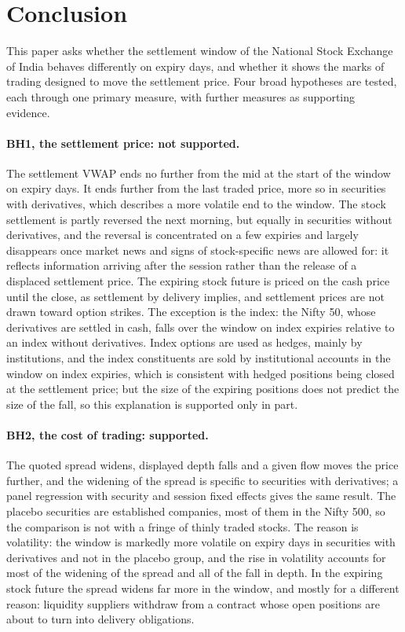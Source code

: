 \section{Conclusion}\label{sec:conclusion}

This paper asks whether the settlement window of the National Stock Exchange of India behaves
differently on expiry days, and whether it shows the marks of trading designed to move the
settlement price. Four broad hypotheses are tested, each through one primary measure, with
further measures as supporting evidence.

\paragraph{BH1, the settlement price: not supported.} The settlement VWAP ends no further from the
mid at the start of the window on expiry days. It ends further from the last traded price, more
so in securities with derivatives, which describes a more volatile end to the window. The stock
settlement is partly reversed the next morning, but equally in securities without derivatives,
and the reversal is concentrated on a few expiries and largely disappears once market news and
signs of stock-specific news are allowed for: it reflects information arriving after the
session rather than the release of a displaced settlement price. The expiring stock
future is priced on the cash price until the close, as settlement by delivery implies, and
settlement prices are not drawn toward option strikes. The exception is the index: the Nifty 50,
whose derivatives are settled in cash, falls over the window on index expiries relative to an
index without derivatives. Index options are used as hedges, mainly by institutions, and the
index constituents are sold by institutional accounts in the window on index expiries, which is
consistent with hedged positions being closed at the settlement price; but the size of the
expiring positions does not predict the size of the fall, so this explanation is supported only
in part.

\paragraph{BH2, the cost of trading: supported.} The quoted spread widens, displayed depth falls
and a given flow moves the price further, and the widening of the spread is specific to
securities with derivatives; a panel regression with security and session fixed effects gives
the same result. The placebo securities are established companies, most of them in the
Nifty 500, so the comparison is not with a fringe of thinly traded stocks. The reason is volatility: the window is markedly more volatile on
expiry days in securities with derivatives and not in the placebo group, and the rise in
volatility accounts for most of the widening of the spread and all of the fall in depth. In the
expiring stock future the spread widens far more in the window, and mostly for a different
reason: liquidity suppliers withdraw from a contract whose open positions are about to turn
into delivery obligations.

